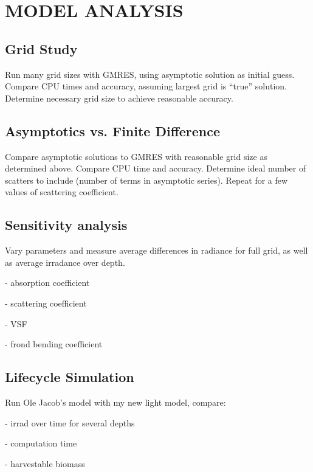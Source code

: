 \chapter{MODEL ANALYSIS} \label{ch:model_analysis}

\section{Grid Study}
Run many grid sizes with GMRES, using asymptotic solution as initial guess.
Compare CPU times and accuracy, assuming largest grid is ``true'' solution.
Determine necessary grid size to achieve reasonable accuracy.

\section{Asymptotics vs. Finite Difference}
Compare asymptotic solutions to GMRES with reasonable grid size as determined
above. Compare CPU time and accuracy. Determine ideal number of scatters to
include (number of terms in asymptotic series). Repeat for a few values of
scattering coefficient.

\section{Sensitivity analysis}
Vary parameters and measure average differences in radiance for full grid, as
well as average irradance over depth.

- absorption coefficient

- scattering coefficient

- VSF

- frond bending coefficient

\section{Lifecycle Simulation}

Run Ole Jacob's model with my new light model, compare:

- irrad over time for several depths

- computation time

- harvestable biomass
